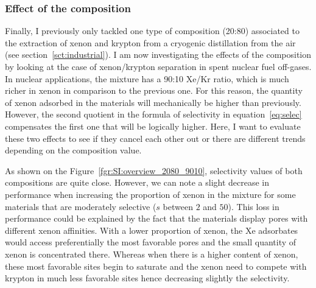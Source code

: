 \documentclass[main.tex]{subfiles}
\begin{document}
\subsubsection{Effect of the composition}

Finally, I previously only tackled one type of composition (20:80) associated to the extraction of xenon and krypton from a cryogenic distillation from the air (see section~\ref{sct:industrial}). I am now investigating the effects of the composition by looking at the case of xenon/krypton separation in spent nuclear fuel off-gases. In nuclear applications, the mixture has a 90:10 Xe/Kr ratio, which is much richer in xenon in comparison to the previous one. For this reason, the quantity of xenon adsorbed in the materials will mechanically be higher than previously. However, the second quotient in the formula of selectivity in equation~\ref{eq:selec} compensates the first one that will be logically higher. Here, I want to evaluate these two effects to see if they cancel each other out or there are different trends depending on the composition value. 

As shown on the Figure~\ref{fgr:SI:overview_2080_9010}, selectivity values of both compositions are quite close. However, we can note a slight decrease in performance when increasing the proportion of xenon in the mixture for some materials that are moderately selective ($s$ between $2$ and $50$). This loss in performance could be explained by the fact that the materials display pores with different xenon affinities. With a lower proportion of xenon, the Xe adsorbates would access preferentially the most favorable pores and the small quantity of xenon is concentrated there. Whereas when there is a higher content of xenon, these most favorable sites begin to saturate and the xenon need to compete with krypton in much less favorable sites hence decreasing slightly the selectivity.
\end{document}

